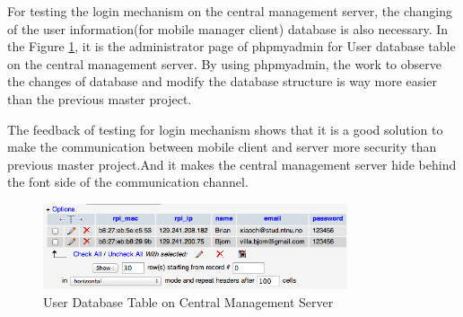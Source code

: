 \par For testing the login mechanism on the central management server, the changing of the user information(for mobile manager client) database is also necessary. In the Figure \ref{fig:database_user}, it is the administrator page of phpmyadmin for User database table on the central management server. By using phpmyadmin, the work to observe the changes of database and modify the database structure is way more easier than the previous master project.
\par The feedback of testing for login mechanism shows that it is a good solution to make the communication between mobile client and server more security than previous master project.And it makes the central management server hide behind the font side of the communication channel.
\begin{figure}
	\centering
    	\includegraphics[width=0.80\textwidth,natwidth=610,natheight=642]{figs/database_user.png}
  	\caption{User Database Table on Central Management Server}
  	\label{fig:database_user}
\end{figure}

